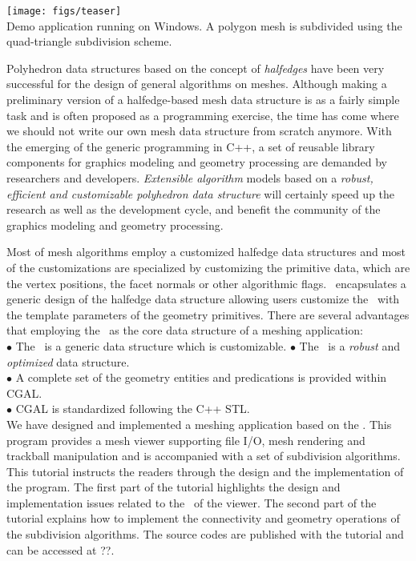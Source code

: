 \documentclass[letter]{article}
\begin{document}
\begin{center} 
  \texttt{[image: figs/teaser]}\\
{\scriptsize Demo application running on Windows. A polygon mesh is 
   subdivided using the quad-triangle subdivision scheme.}

\end{center}

Polyhedron data structures based on the concept of
\emph{halfedges} have been very successful for the design
of general algorithms on meshes. 
Although making a preliminary version of a halfedge-based mesh data
structure is as a fairly simple task and is often proposed as a
programming exercise, the time has come where we should not write our
own mesh data structure from scratch anymore. With the emerging of
the generic programming in C++, a set of reusable library
components for graphics modeling and geometry processing are demanded
by researchers and developers. \emph{Extensible algorithm} models based on
a \emph{robust, efficient and customizable polyhedron 
data structure} will certainly speed up
the research as well as the development cycle, and benefit the 
community of the graphics modeling and geometry processing.  

Most of mesh algorithms employ a customized 
halfedge data structures and most of the customizations 
are specialized by customizing the primitive data, 
which are the vertex positions, the facet normals or other 
algorithmic flags. \cgalpoly\ encapsulates a generic
design of the halfedge data structure allowing users
customize the \poly\ with the template parameters of
the geometry primitives. There are several advantages
that employing the \poly\ as the core data structure
of a meshing application: \\
\indent $\bullet$ The \poly\ is a generic data structure which 
is customizable.
\indent $\bullet$ The \poly\ is a \emph{robust} and \emph{optimized} 
data structure.\\
\indent $\bullet$ A complete set of the geometry entities and predications 
is provided within CGAL.\\
\indent $\bullet$ CGAL is standardized following the C++ STL.\\

We have designed and implemented a meshing application
based on the \cgalpoly . This program provides a
mesh viewer supporting file I/O, mesh rendering 
and trackball manipulation and is accompanied with a set of 
subdivision algorithms. This tutorial instructs
the readers through the design and the implementation of the 
program. The first part of the 
tutorial highlights the design and implementation issues 
related to the \poly\ of the viewer. The second part
of the tutorial explains how to implement 
the connectivity and geometry operations of the 
subdivision algorithms. The source codes are 
published with the tutorial and can be accessed at ??.
\end{document}
